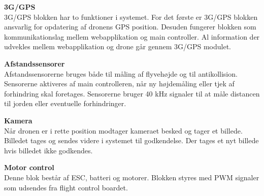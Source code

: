 \textbf{3G/GPS}\\
3G/GPS blokken har to funktioner i systemet. For det første er 3G/GPS blokken ansvarlig for opdatering af dronens GPS position. Desuden fungerer blokken som kommunikationslag mellem webapplikation og main controller. Al information der udvekles mellem webapplikation og drone går gennem 3G/GPS modulet.

\textbf{Afstandssensorer}\\
Afstandssensorerne bruges både til måling af flyvehøjde og til antikollision. Sensorerne aktiveres af main controlleren, når ny højdemåling eller tjek af forhindring skal foretages. Sensorerne bruger 40 kHz signaler til at måle distancen til jorden eller eventuelle forhindringer.

\textbf{Kamera}\\
Når dronen er i rette position modtager kameraet besked og tager et billede. Billedet tages og sendes videre i systemet til godkendelse. Der tages et nyt billede hvis billedet ikke godkendes.

\textbf{Motor control}\\
Denne blok består af ESC, batteri og motorer. Blokken styres med PWM signaler som udsendes fra flight control boardet.
